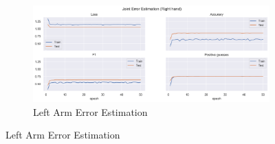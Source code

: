 \begin{figure}[!htbp]
\begin{subfigure}[b]{0.47\linewidth}
      \label{fig:v1_leha_jt_ee}
  \end{subfigure}
  \hfill
  \begin{subfigure}[b]{0.47\linewidth}
      \centering
      \includegraphics[width=\textwidth]{figures/Results/v1/jt/Right hand_ErrorEstimation.png}
      \caption{Left Arm Error Estimation}
      \label{fig:v1_riha_jt_ee}
  \end{subfigure}
\end{figure}

